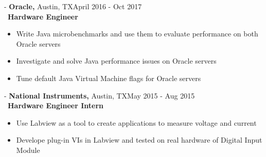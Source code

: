 \documentclass[12pt]{res}
\begin{document}
\begin{resume}
 -\sectionwidth \resumewidth
{\textbf{Oracle,}  Austin, TX\hfill April 2016 - Oct 2017} \hspace{-0.58in}\vspace{-0mm}\\\
  \textbf{Hardware Engineer} \\
 \vspace{-14pt}
 \begin{itemize}[leftmargin=-0.1in]
   \item Write Java microbenchmarks and use them to evaluate performance on both Oracle servers %
   \item Investigate and solve Java performance issues on Oracle servers 
   \item Tune default Java Virtual Machine flags for Oracle servers
 \end{itemize}

\vspace{-10pt}

 -\sectionwidth \resumewidth
{\textbf{National Instruments,}  Austin, TX\hfill May 2015 - Aug 2015} \hspace{-0.58in}\vspace{-0mm}\\\
  \textbf{Hardware Engineer Intern} \\
 \vspace{-14pt}
 \begin{itemize}[leftmargin=-0.1in]
  \item Use Labview as a tool to create applications to measure voltage and current%
  \item Develope plug-in VIs in Labview and tested on real hardware of Digital Input Module\\
   \end{itemize}%
   
   

\end{resume}
\end{document}
